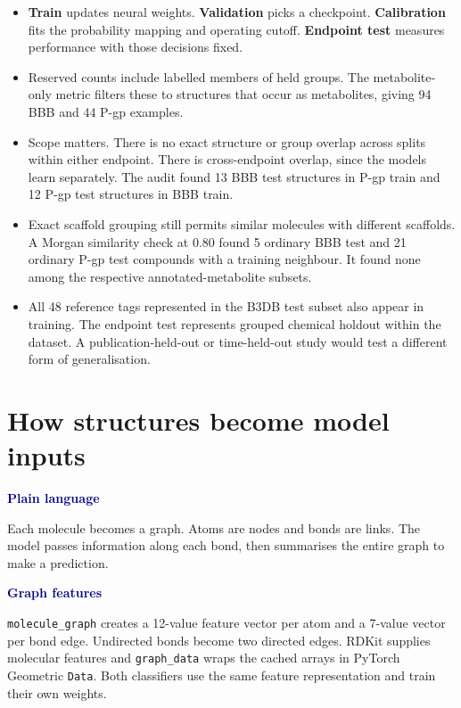 \documentclass[11pt,a4paper]{article}
\newcommand{\code}[1]{\nolinkurl{#1}}
\newcommand{\lead}[1]{\par\smallskip\textbf{\textcolor{Navy}{#1}}\par\nobreak}
\newcommand{\pagehead}[1]{\clearpage\section{#1}}
\newenvironment{compact}{\begin{itemize}[leftmargin=*,topsep=2pt,itemsep=1pt,parsep=0pt]}{\end{itemize}}
\begin{document}
\begin{compact}
\item \textbf{Train} updates neural weights. \textbf{Validation} picks a checkpoint. \textbf{Calibration} fits the probability mapping and operating cutoff. \textbf{Endpoint test} measures performance with those decisions fixed.
\item Reserved counts include labelled members of held groups. The metabolite-only metric filters these to structures that occur as metabolites, giving 94 BBB and 44 P-gp examples.
\item Scope matters. There is no exact structure or group overlap across splits within either endpoint. There is cross-endpoint overlap, since the models learn separately. The audit found 13 BBB test structures in P-gp train and 12 P-gp test structures in BBB train.
\item Exact scaffold grouping still permits similar molecules with different scaffolds. A Morgan similarity check at 0.80 found 5 ordinary BBB test and 21 ordinary P-gp test compounds with a training neighbour. It found none among the respective annotated-metabolite subsets.
\item All 48 reference tags represented in the B3DB test subset also appear in training. The endpoint test represents grouped chemical holdout within the dataset. A publication-held-out or time-held-out study would test a different form of generalisation.
\end{compact}

\pagehead{How structures become model inputs}
\lead{Plain language}
Each molecule becomes a graph. Atoms are nodes and bonds are links. The model passes information along each bond, then summarises the entire graph to make a prediction.

\lead{Graph features}
\code{molecule_graph} creates a 12-value feature vector per atom and a 7-value vector per bond edge. Undirected bonds become two directed edges. RDKit supplies molecular features and \code{graph_data} wraps the cached arrays in PyTorch Geometric \code{Data}. Both classifiers use the same feature representation and train their own weights.
\end{document}
